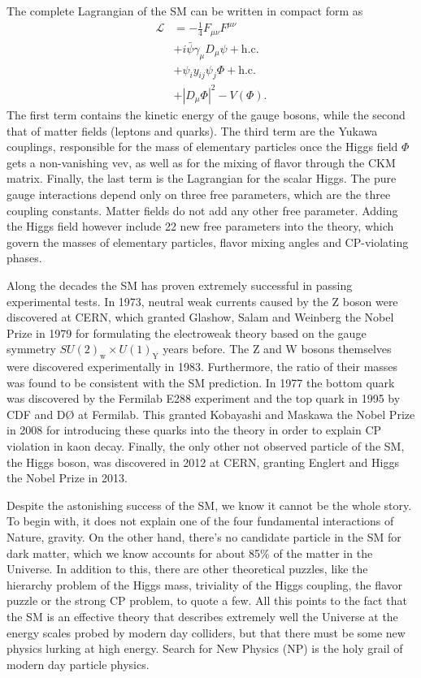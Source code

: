 The complete Lagrangian of the SM can be written in compact form as
\begin{align*}
\mathcal{L}&=-\frac{1}{4}F_{\mu\nu}F^{\mu\nu}\\
&+i\bar{\psi}\gamma_{\mu}D_{\mu}\psi+\textrm{h.c.}\\
&+\psi_iy_{ij}\psi_j\Phi+\textrm{h.c.}\\
&+|D_{\mu}\Phi|^2-V(\Phi).
\end{align*}
The first term contains the kinetic energy of the gauge bosons, while the second that of matter fields (leptons and quarks). The third term are the Yukawa couplings, responsible for the mass of elementary particles once the Higgs field $\Phi$ gets a non-vanishing vev, as well as for the mixing of flavor through the CKM matrix. Finally, the last term is the Lagrangian for the scalar Higgs. The pure gauge interactions depend only on three free parameters, which are the three coupling constants. Matter fields do not add any other free parameter. Adding the Higgs field however include 22 new free parameters into the theory, which govern the masses of elementary particles, flavor mixing angles and CP-violating phases.

Along the decades the SM has proven extremely successful in passing experimental tests. In 1973, neutral weak currents caused by the Z boson were discovered at CERN, which granted Glashow, Salam and Weinberg the Nobel Prize in 1979 for formulating the electroweak theory based on the gauge symmetry $SU(2)_{\textrm{w}}\times U(1)_{\textrm{Y}}$ years before. The Z and W bosons themselves were discovered experimentally in 1983. Furthermore, the ratio of their masses was found to be consistent with the SM prediction. In 1977 the bottom quark was discovered by the Fermilab E288 experiment and the top quark in 1995 by CDF and DØ at Fermilab. This granted Kobayashi and Maskawa the Nobel Prize in 2008 for introducing these quarks into the theory in order to explain CP violation in kaon decay. Finally, the only other not observed particle of the SM, the Higgs boson, was discovered in 2012 at CERN, granting Englert and Higgs the Nobel Prize in 2013.

Despite the astonishing success of the SM, we know it cannot be the whole story. To begin with, it does not explain one of the four fundamental interactions of Nature, gravity. On the other hand, there's no candidate particle in the SM for dark matter, which we know accounts for about 85\% of the matter in the Universe. In addition to this, there are other theoretical puzzles, like the hierarchy problem of the Higgs mass, triviality of the Higgs coupling, the flavor puzzle or the strong CP problem, to quote a few. All this points to the fact that the SM is an effective theory that describes extremely well the Universe at the energy scales probed by modern day colliders, but that there must be some new physics lurking at high energy. Search for New Physics (NP) is the holy grail of modern day particle physics. 

